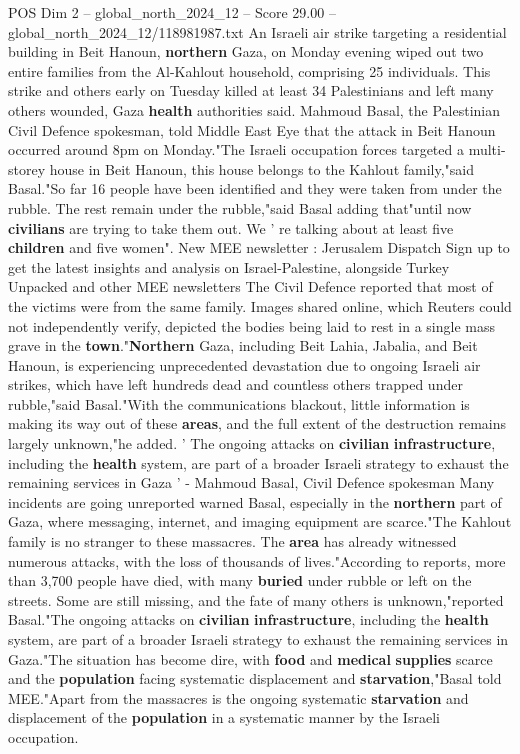 \begin{textsample}{POS Dim 2 – global\_north\_2024\_12 – Score 29.00 – global\_north\_2024\_12/118981987.txt}  \label{ex:f2_pos_188}
An Israeli air strike targeting a residential building in Beit Hanoun, \textbf{northern} Gaza, on Monday evening wiped out two entire families from the Al-Kahlout household, comprising 25 individuals.
This strike and others early on Tuesday killed at least 34 Palestinians and left many others wounded, Gaza \textbf{health} authorities said.
Mahmoud Basal, the Palestinian Civil Defence spokesman, told Middle East Eye that the attack in Beit Hanoun occurred around 8pm on Monday."The Israeli occupation forces targeted a multi-storey house in Beit Hanoun, this house belongs to the Kahlout family,"said Basal."So far 16 people have been identified and they were taken from under the rubble.
The rest remain under the rubble,"said Basal adding that"until now \textbf{civilians} are trying to take them out.
We ' re talking about at least five \textbf{children} and five women".
New MEE newsletter : Jerusalem Dispatch Sign up to get the latest insights and analysis on Israel-Palestine, alongside Turkey Unpacked and other MEE newsletters The Civil Defence reported that most of the victims were from the same family.
Images shared online, which Reuters could not independently verify, depicted the bodies being laid to rest in a single mass grave in the \textbf{town}."\textbf{Northern} Gaza, including Beit Lahia, Jabalia, and Beit Hanoun, is experiencing unprecedented devastation due to ongoing Israeli air strikes, which have left hundreds dead and countless others trapped under rubble,"said Basal."With the communications blackout, little information is making its way out of these \textbf{areas}, and the full extent of the destruction remains largely unknown,"he added. ' The ongoing attacks on \textbf{civilian} \textbf{infrastructure}, including the \textbf{health} system, are part of a broader Israeli strategy to exhaust the remaining services in Gaza ' - Mahmoud Basal, Civil Defence spokesman Many incidents are going unreported warned Basal, especially in the \textbf{northern} part of Gaza, where messaging, internet, and imaging equipment are scarce."The Kahlout family is no stranger to these massacres.
The \textbf{area} has already witnessed numerous attacks, with the loss of thousands of lives."According to reports, more than 3,700 people have died, with many \textbf{buried} under rubble or left on the streets.
Some are still missing, and the fate of many others is unknown,"reported Basal."The ongoing attacks on \textbf{civilian} \textbf{infrastructure}, including the \textbf{health} system, are part of a broader Israeli strategy to exhaust the remaining services in Gaza."The situation has become dire, with \textbf{food} and \textbf{medical} \textbf{supplies} scarce and the \textbf{population} facing systematic displacement and \textbf{starvation},"Basal told MEE."Apart from the massacres is the ongoing systematic \textbf{starvation} and displacement of the \textbf{population} in a systematic manner by the Israeli occupation.

\end{textsample}
